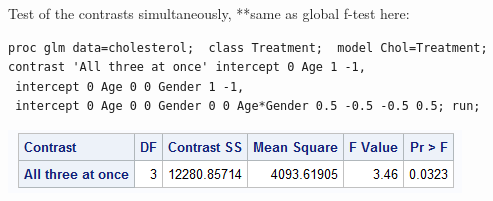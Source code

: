 Test of the contrasts simultaneously, **same as global f-test here:
\begin{small}
\begin{verbatim}
proc glm data=cholesterol;  class Treatment;  model Chol=Treatment;
contrast 'All three at once' intercept 0 Age 1 -1,
 intercept 0 Age 0 0 Gender 1 -1,
 intercept 0 Age 0 0 Gender 0 0 Age*Gender 0.5 -0.5 -0.5 0.5; run;
\end{verbatim}
\end{small}

\begin{flushleft}
\includegraphics[scale=0.75]{CholThreeContrasts}
\end{flushleft}

